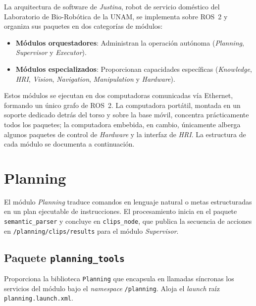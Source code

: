 \label{app:justina}

La arquitectura de software de \emph{Justina}, robot de servicio doméstico del Laboratorio de Bio-Robótica de la UNAM, se implementa sobre ROS~2 y organiza sus paquetes en dos categorías de módulos:

\begin{itemize}
    \item \textbf{Módulos orquestadores}: Administran la operación autónoma (\emph{Planning}, \emph{Supervisor} y \emph{Executor}).
    \item \textbf{Módulos especializados}: Proporcionan capacidades específicas (\emph{Knowledge}, \emph{HRI}, \emph{Vision}, \emph{Navigation}, \emph{Manipulation} y \emph{Hardware}).
\end{itemize}

Estos módulos se ejecutan en dos computadoras comunicadas vía Ethernet, formando un único grafo de ROS~2. La computadora portátil, montada en un soporte dedicado detrás del torso y sobre la base móvil, concentra prácticamente todos los paquetes; la computadora embebida, en cambio, únicamente alberga algunos paquetes de control de \emph{Hardware} y la interfaz de \emph{HRI}. La estructura de cada módulo se documenta a continuación.


\section[Planning]{Planning}
\label{app:justina_planning}

El módulo \textit{Planning} traduce comandos en lenguaje natural o metas estructuradas en un plan ejecutable de instrucciones. El procesamiento inicia en el paquete \texttt{semantic\_parser} y concluye en \texttt{clips\_node}, que publica la secuencia de acciones en \texttt{/planning/clips/results} para el módulo \textit{Supervisor}.


\subsection{Paquete \texttt{planning\_tools}}
Proporciona la biblioteca \texttt{Planning} que encapsula en llamadas síncronas los servicios del módulo bajo el \textit{namespace} \texttt{/planning}. Aloja el \textit{launch} raíz \texttt{planning.launch.xml}.

